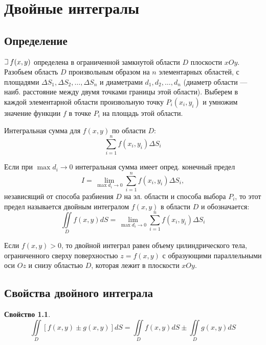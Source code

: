 \documentclass[a4paper,12pt,oneside]{extbook}
\def\lets{%
    \mathord{\setbox0=\hbox{$\exists$}%
        \hbox{\kern 0.125\wd0%
            \vbox to \ht0{%
                \hrule width 0.75\wd0%
                \vfill%
                \hrule width 0.75\wd0}%
            \vrule height \ht0%
            \kern 0.125\wd0}%
    }%
    \hspace{2pt}
}
\theoremstyle{numbered}
\newtheorem{property}{Свойство}[section]
\theoremstyle{unnumbered}
\theoremstyle{named}
\theoremstyle{unnumbered}
\theoremstyle{named}
\theoremstyle{named}
\theoremstyle{named}
\begin{document}
\chapter{Двойные интегралы}%
\label{cha:Двойные интегралы}

\section{Определение}%
\label{sec:Определение}

\(\lets f(x, y)\) определена в ограниченной замкнутой области \(D\) плоскости \(xOy\). Разобьем область \(D\) произвольным образом на \(n\) элементарных областей, с площадями \(\Delta S_1, \Delta S_2, \ldots, \Delta S_n\) и диаметрами \(d_1, d_2, \ldots, d_n\) (диаметр области — наиб. расстояние между двумя точками границы этой области). Выберем в каждой элементарной области произвольную точку \(P_i (x_i, y_i)\) и умножим значение функции \(f\) в точке \(P_i\) на площадь этой области.

Интегральная сумма для \(f(x, y)\) по области \(D\):
\begin{equation}
    \sum_{i=1}^n f(x_i, y_i) \Delta S_i
\end{equation}

Если при \(\max{d_i} \to 0\) интегральная сумма имеет опред. конечный предел
\begin{equation}
    I = \lim_{\max{d_i} \to 0}{\sum_{i = 1}^n f(x_i, y_i) \Delta S_i},
\end{equation}
независящий от способа разбиения \(D\) на эл. области и способа выбора \(P_i\), то этот предел называется двойным интегралом \(f(x, y)\) в области \(D\) и обозначается:
\begin{equation}
    \iint\limits_D f(x, y) dS = \lim_{\max{d_i} \to 0}{\sum_{i = 1}^n f(x_i, y_i) \Delta S_i}
\end{equation}

Если \(f(x, y) > 0\), то двойной интеграл равен объему цилиндрического тела, ограниченного сверху поверхностью \(z = f(x, y)\) с образующими параллельными оси \(Oz\) и снизу областью \(D\), которая лежит в плоскости \(xOy\).

\section{Свойства двойного интеграла}%
\label{sec:Свойства двойного интеграла}

\begin{property}
    \begin{equation}
        \iint\limits_D [f(x, y) \pm g(x, y)]dS = \iint\limits_D f(x, y)dS \pm \iint\limits_D g(x, y)dS
    \end{equation}
\end{property}
\end{document}
